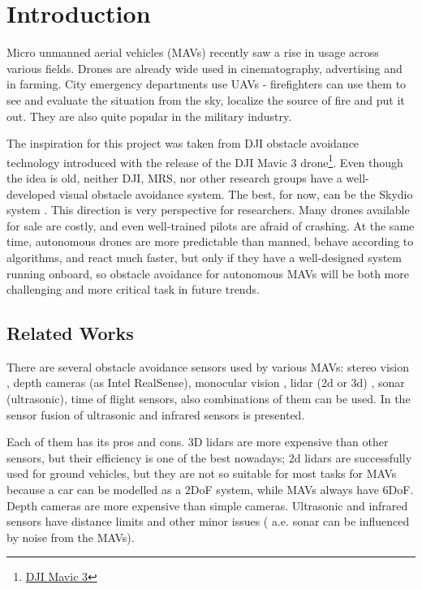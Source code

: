 \chapter{Introduction}

\label{chapter:intro}

Micro unmanned aerial vehicles (MAVs) recently saw a rise in usage across various fields. Drones are already wide used in cinematography\cite{Mademlis2020}, advertising\cite{Ullah2021} and in farming\cite{Kim2019}. 
City emergency departments use UAVs  - firefighters can use them to see and evaluate the situation from the sky, localize the source of fire and put it out\cite{Pritzl2021}. 
They are also quite popular in the military industry.

The inspiration for this project was taken from DJI obstacle avoidance technology introduced with the release of the DJI Mavic 3 drone\footnote{\href{https://www.dji.com/cz/mavic-3}{DJI Mavic 3}}. 
Even though the idea is old, neither DJI, MRS, nor other research groups have a well-developed visual obstacle avoidance system. The best, for now, can be the Skydio system . 
This direction is very perspective for researchers. Many drones available for sale are costly, and even well-trained pilots are afraid of crashing. 
At the same time, autonomous drones are more predictable than manned, behave according to algorithms, and react much faster, but only if they have a well-designed system running onboard, so obstacle avoidance for autonomous MAVs will be both more challenging and more critical task in future trends.

\section{Related Works}
There are several obstacle avoidance sensors used by various MAVs: stereo vision \cite{Ruf2018}, depth cameras (as Intel RealSense), monocular vision \cite{Mejias2010}, lidar (2d or 3d) \cite{Ramasamy2016}, sonar (ultrasonic), time of flight sensors, also combinations of them can be used. 
In \cite{Rambabu2015} the sensor fusion of ultrasonic and infrared sensors is presented.

Each of them has its pros and cons. 
3D lidars are more expensive than other sensors, but their efficiency is one of the best nowadays; 2d lidars are successfully used for ground vehicles, but they are not so suitable for most tasks for MAVs because a car can be modelled as a 2DoF system, while MAVs always have 6DoF. 
Depth cameras are more expensive than simple cameras. Ultrasonic and infrared sensors have distance limits and other minor issues ( a.e. sonar can be influenced by noise from the MAVs). 

